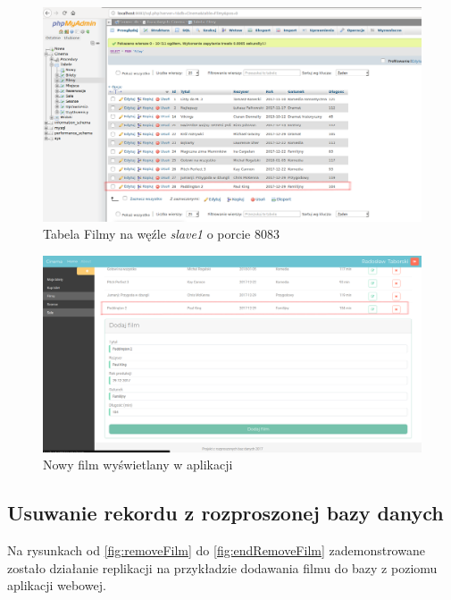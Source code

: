 \begin{figure} [H]
	\centering
	\includegraphics[width=1\linewidth]{rozdzial06/8.png}
	\caption{Tabela Filmy na węźle \textit{slave1} o porcie 8083}
	\label{fig:FilmSlave}
\end{figure}

\begin{figure} [H]
	\centering
	\includegraphics[width=1\linewidth]{rozdzial06/6.png}
	\caption{Nowy film wyświetlany w aplikacji}
	\label{fig:endAddFilm}
\end{figure}

\subsection{Usuwanie rekordu z rozproszonej bazy danych}

Na rysunkach od \ref{fig:removeFilm} do \ref{fig:endRemoveFilm} zademonstrowane zostało działanie replikacji na przykładzie dodawania filmu do bazy z poziomu aplikacji webowej.\\


